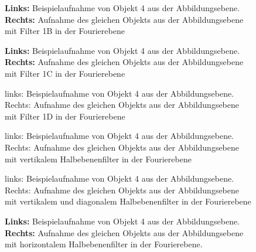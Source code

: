 \begin{figure}[h]
	\centering
	\caption{
		\textbf{Links:} Beispielaufnahme von Objekt 4 aus der Abbildungsebene.\\
		\textbf{Rechts:} Aufnahme des gleichen Objekts aus der Abbildungsebene mit Filter 1B in der Fourierebene}
	\label{fig:example10_Filter1B}
\end{figure}

\begin{figure}[h]
	\centering
	\caption{
		\textbf{Links:} Beispielaufnahme von Objekt 4 aus der Abbildungsebene.\\
		\textbf{Rechts:} Aufnahme des gleichen Objekts aus der Abbildungsebene mit Filter 1C in der Fourierebene
	}
	\label{fig:example11_Filter1C}
\end{figure}

\begin{figure}[h]
	\centering
	\caption{links: Beispielaufnahme von Objekt 4 aus der Abbildungsebene. Rechts: Aufnahme des gleichen Objekts aus der Abbildungsebene mit Filter 1D in der Fourierebene}
	\label{fig:example12_Filter1D}
\end{figure}

\begin{figure}[h]
	\centering
	\caption{links: Beispielaufnahme von Objekt 4 aus der Abbildungsebene. Rechts: Aufnahme des gleichen Objekts aus der Abbildungsebene mit vertikalem Halbebenenfilter in der Fourierebene}
	\label{fig:example17}
\end{figure}

\begin{figure}[h]
	\centering
	\caption{links: Beispielaufnahme von Objekt 4 aus der Abbildungsebene. Rechts: Aufnahme des gleichen Objekts aus der Abbildungsebene mit vertikalem und diagonalem Halbebenenfilter in der Fourierebene}
	\label{fig:example18}
\end{figure}

\begin{figure}[h]
	\centering
	\caption{
		\textbf{Links:} Beispielaufnahme von Objekt 4 aus der Abbildungsebene.\\
		\textbf{Rechts:} Aufnahme des gleichen Objekts aus der Abbildungsebene mit horizontalem Halbebenenfilter in der Fourierebene.
	}
	\label{fig:example19}
\end{figure}

